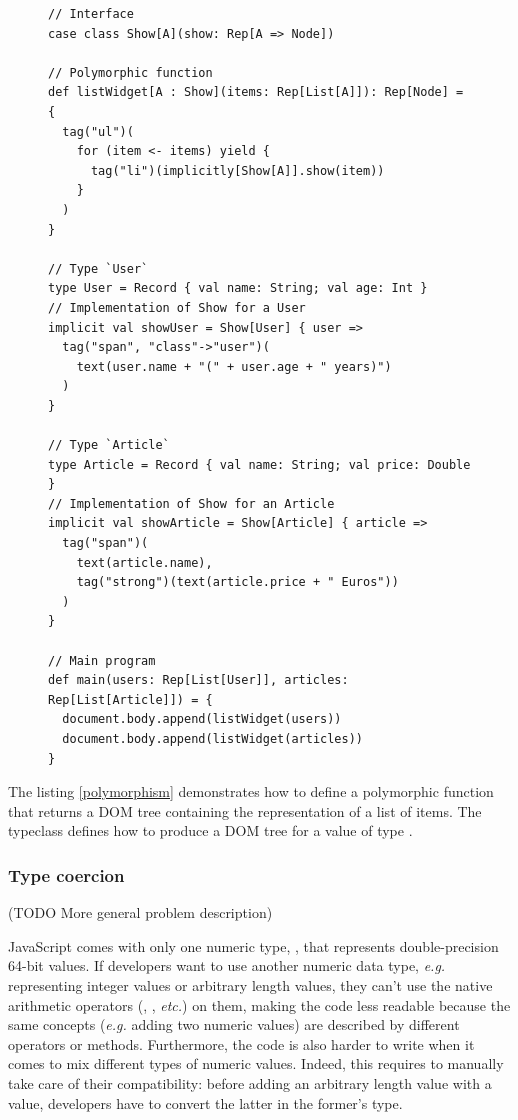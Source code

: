 \documentclass[american,english,runningheads]{llncs}
\newcommand{\eg}{\emph{e.g.}}
\newcommand{\etc}{\emph{etc.}}
\begin{document}
\begin{figure}
\begin{lstlisting}[label=polymorphism,caption=Adhoc polymorphism using typeclasses]
// Interface
case class Show[A](show: Rep[A => Node])

// Polymorphic function
def listWidget[A : Show](items: Rep[List[A]]): Rep[Node] = {
  tag("ul")(
    for (item <- items) yield {
      tag("li")(implicitly[Show[A]].show(item))
    }
  )
}

// Type `User`
type User = Record { val name: String; val age: Int }
// Implementation of Show for a User
implicit val showUser = Show[User] { user =>
  tag("span", "class"->"user")(
    text(user.name + "(" + user.age + " years)")
  )
}

// Type `Article`
type Article = Record { val name: String; val price: Double }
// Implementation of Show for an Article
implicit val showArticle = Show[Article] { article =>
  tag("span")(
    text(article.name),
    tag("strong")(text(article.price + " Euros"))
  )
}

// Main program
def main(users: Rep[List[User]], articles: Rep[List[Article]]) = {
  document.body.append(listWidget(users))
  document.body.append(listWidget(articles))
}
\end{lstlisting}
\end{figure}

The listing \ref{polymorphism} demonstrates how to define a polymorphic  function that returns a DOM tree containing the representation of a list of items. The  typeclass defines how to produce a DOM tree for a value of type .

\subsubsection{Type coercion}

(TODO More general problem description)

JavaScript comes with only one numeric type, , that represents double-precision 64-bit values. If developers want to use another numeric data type, \eg{} representing integer values or arbitrary length values, they can’t use the native arithmetic operators (\code{+}, \code{-}, \etc) on them, making the code less readable because the same concepts (\eg{} adding two numeric values) are described by different operators or methods. Furthermore, the code is also harder to write when it comes to mix different types of numeric values. Indeed, this requires to manually take care of their compatibility: before adding an arbitrary length value with a  value, developers have to convert the latter in the former’s type.
\end{document}
